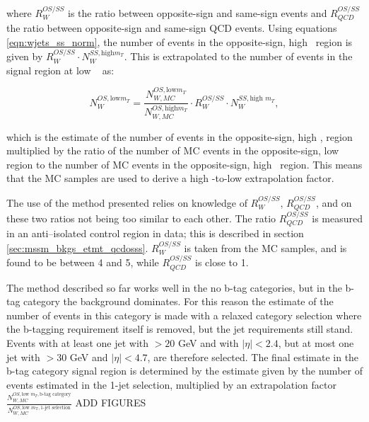 where $R_{W}^{OS/SS}$ is the ratio between opposite-sign and same-sign \Wjets events
and $R_{QCD}^{OS/SS}$ the ratio between opposite-sign and same-sign QCD events. Using 
equations \ref{eqn:wjets_ss_norm}, the number of \Wjets events in the
opposite-sign, high \mT~region is given by $R_{W}^{OS/SS}\cdot N_{W}^{SS,\text{high} m_{T}}$. 
This is extrapolated to the number of \Wjets events in the signal region at low \mT~ as:

\begin{equation}\label{eqn:wjets_os_norm}
N_{W}^{OS,\text{low} m_{T}} = \frac{N_{W,MC}^{OS,\text{low} m_{T}}}{N_{W,MC}^{OS,\text{high} m_{T}}}\cdot R_{W}^{OS/SS} \cdot N_W^{SS,\text{high }m_{T}},
\end{equation}

which is the estimate of the number of \Wjets events in the opposite-sign, high \mT, region
multiplied by the ratio of the number of \ac{MC} events in the opposite-sign, low \mT~ region to the number of \ac{MC} events in the opposite-sign, high \mT~region. This means that
the \ac{MC} samples are used to derive a high \mT-to-low \mT extrapolation factor.

The use of the method presented relies on knowledge of $R_{W}^{OS/SS}$,
$R_{QCD}^{OS/SS}$, and on these two ratios not being too similar to each other. 
The ratio $R_{QCD}^{OS/SS}$ is measured in an anti--isolated
control region in data; this is described in section \ref{sec:mssm_bkgs_etmt_qcdosss}. $R_{W}^{OS/SS}$ is 
taken from the \Wjets \ac{MC} samples, and is found to be between 4 and 5, while $R_{QCD}^{OS/SS}$
is close to 1.

The method described so far works well in the no b-tag categories, but in the b-tag category
the \ttbar background dominates. For this reason the estimate of the number
of \Wjets events in this category is made with a relaxed category selection where the b-tagging
requirement itself is removed, but the jet requirements still stand. Events with at least one 
jet with \pT$>20$ GeV and with $|\eta|<2.4$, but at most one jet with \pT$>30$ GeV and $|\eta|<4.7$, are therefore selected. The final \Wjets estimate in the b-tag category signal
region is determined by the estimate given by the number of \Wjets events
estimated in the 1-jet selection, multiplied by an extrapolation factor 
$\frac{N_{W,MC}^{OS,\text{low } m_{T},\text{b-tag category}}}{N_{W,MC}^{OS,\text{low }m_{\text{T}},\text{1-jet selection}}}$ ADD FIGURES

